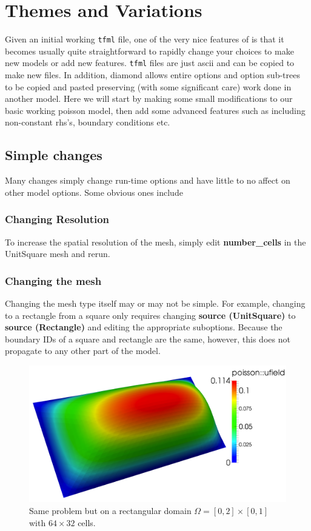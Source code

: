 



\section{Themes and Variations}
\label{sec:themes-variations}

Given an initial working \texttt{tfml} file, one of the very nice
features of \TF{} is that it becomes usually quite straightforward to
rapidly change your choices to make new models or add new features.
\texttt{tfml} files are just ascii and can be copied to make new
files. In addition,  diamond allows entire options and option
sub-trees to be copied and pasted preserving (with some significant
care) work done in another model.  Here we will start by making some
small modifications to our basic working poisson model, then add some
advanced features such as including non-constant rhs's, boundary
conditions etc.

\subsection{Simple changes}
\label{sec:simple-changes}

Many changes simply change run-time options and have little to no
affect on other model options.  Some obvious ones include
\subsubsection{Changing Resolution}
\label{sec:changing-elements}

To increase the spatial resolution of the mesh, simply edit
\textbf{number\_cells} in the UnitSquare mesh and rerun.

\subsubsection{Changing the mesh}
\label{sec:changing-mesh}

Changing the mesh type itself may or may not be simple.  For example, changing to a rectangle
from a square only requires changing \textbf{source (UnitSquare)} to
\textbf{source (Rectangle)} and editing the appropriate
suboptions. Because the boundary IDs of a square and rectangle are
the same, however, this does not propagate to any other part of the
model. 
\begin{figure}[h!]
  \centering
\includegraphics[width=.7\textwidth]{figures/poisson_simple_rectangle}
  \caption{\small Same problem but on a rectangular domain
    $\Omega=[0,2]\times[0,1]$ with $64\times32$ cells.}
\label{fig:poisson_rectangle}
\end{figure}

